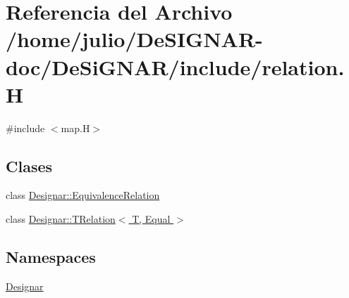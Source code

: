 \hypertarget{relation_8_h}{}\section{Referencia del Archivo /home/julio/\+De\+S\+I\+G\+N\+A\+R-\/doc/\+De\+Si\+G\+N\+A\+R/include/relation.H}
\label{relation_8_h}
{\ttfamily \#include $<$map.\+H$>$}\newline
\subsection*{Clases}
\begin{DoxyCompactItemize}
\item 
class \hyperlink{class_designar_1_1_equivalence_relation}{Designar\+::\+Equivalence\+Relation}
\item 
class \hyperlink{class_designar_1_1_t_relation}{Designar\+::\+T\+Relation$<$ T, Equal $>$}
\end{DoxyCompactItemize}
\subsection*{Namespaces}
\begin{DoxyCompactItemize}
\item 
 \hyperlink{namespace_designar}{Designar}
\end{DoxyCompactItemize}

